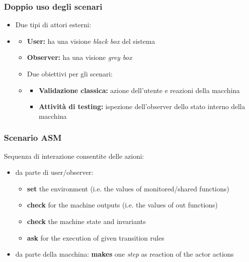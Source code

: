 \subsubsection{Doppio uso degli scenari}
\begin{itemize}
    \item Due tipi di attori esterni:
    \item \begin{itemize}
        \item \textbf{User:} ha una visione \textit{black box} del sistema
        \item \textbf{Observer:} ha una visione \textit{grey box}
    \item Due obiettivi per gli scenari:
    \item \begin{itemize}
        \item \textbf{Validazione classica:} azione dell'utente e reazioni della macchina
        \item \textbf{Attività di testing:} ispezione dell’observer dello stato interno
        della macchina
    \end{itemize}
    \end{itemize}
\end{itemize}

\subsubsection{Scenario ASM}
Sequenza di interazione consentite delle azioni:
\begin{itemize}
    \item da parte di user/observer: 
    \begin{itemize}
        \item \textbf{set} the environment (i.e. the values of
        monitored/shared functions)
        \item \textbf{check} for the machine outputs (i.e. the values of
        out functions)
        \item \textbf{check} the machine state and invariants
        \item \textbf{ask} for the execution of given transition rules
    \end{itemize}
    \item da parte della macchina: 
    \textbf{makes} one \textit{step} as reaction of the actor actions
\end{itemize}


